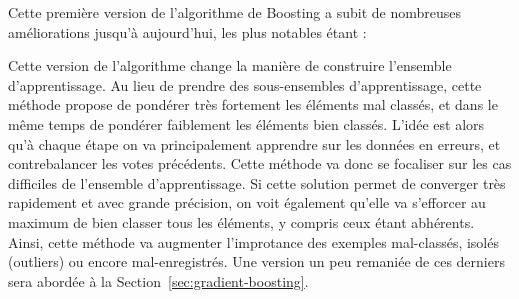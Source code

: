 Cette première version de l'algorithme de Boosting a subit de nombreuses améliorations jusqu'à aujourd'hui, les plus notables étant :
\begin{itemize}
	Cette version de l'algorithme change la manière de construire l'ensemble d'apprentissage. Au lieu de prendre des sous-ensembles d'apprentissage, cette méthode propose de pondérer très fortement les éléments mal classés, et dans le même temps de pondérer faiblement les éléments bien classés. L'idée est alors qu'à chaque étape on va principalement apprendre sur les données en erreurs, et contrebalancer les votes précédents. Cette méthode va donc se focaliser sur les cas \og difficiles\fg{} de l'ensemble d'apprentissage. Si cette solution permet de converger très rapidement et avec grande précision, on voit également qu'elle va s'efforcer au maximum de bien classer tous les éléments, y compris ceux étant abhérents. Ainsi, cette méthode va augmenter l'improtance des exemples mal-classés, isolés (outliers) ou encore mal-enregistrés.
	Une version un peu remaniée de ces derniers sera abordée à la Section~\ref{sec:gradient-boosting}.
\end{itemize}
